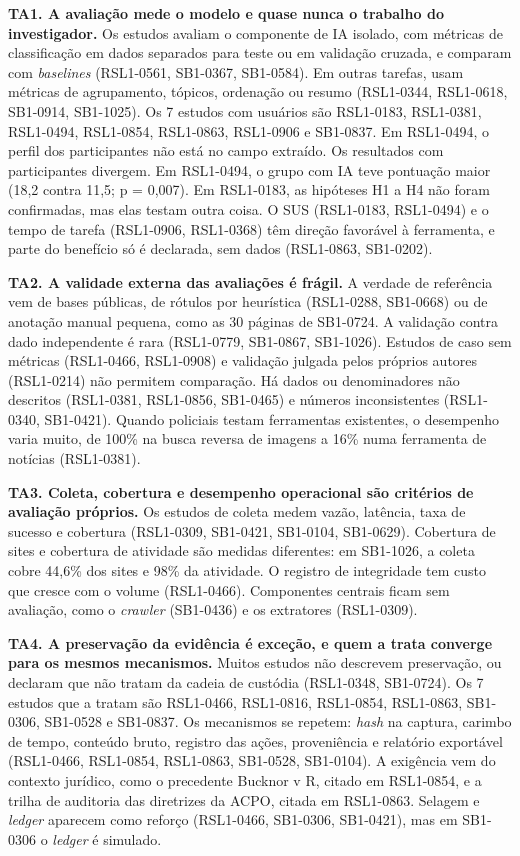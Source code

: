 \textbf{TA1. A avaliação mede o modelo e quase nunca o trabalho do
investigador.} Os estudos avaliam o componente de IA isolado, com métricas de
classificação em dados separados para teste ou em validação cruzada, e
comparam com \textit{baselines} (RSL1-0561, SB1-0367, SB1-0584). Em outras
tarefas, usam métricas de agrupamento, tópicos, ordenação ou resumo
(RSL1-0344, RSL1-0618, SB1-0914, SB1-1025). Os 7 estudos com usuários são
RSL1-0183, RSL1-0381, RSL1-0494, RSL1-0854, RSL1-0863, RSL1-0906 e SB1-0837.
Em RSL1-0494, o perfil dos participantes não está no campo extraído. Os
resultados com participantes divergem. Em RSL1-0494, o grupo com IA teve
pontuação maior (18,2 contra 11,5; p = 0,007). Em RSL1-0183, as hipóteses
H1 a H4 não foram confirmadas, mas elas testam outra coisa. O SUS
(RSL1-0183, RSL1-0494) e o tempo de tarefa (RSL1-0906, RSL1-0368) têm
direção favorável à ferramenta, e parte do benefício só é declarada, sem
dados (RSL1-0863, SB1-0202).

\textbf{TA2. A validade externa das avaliações é frágil.} A verdade de
referência vem de bases públicas, de rótulos por heurística (RSL1-0288,
SB1-0668) ou de anotação manual pequena, como as 30 páginas de SB1-0724. A
validação contra dado independente é rara (RSL1-0779, SB1-0867, SB1-1026).
Estudos de caso sem métricas (RSL1-0466, RSL1-0908) e validação julgada
pelos próprios autores (RSL1-0214) não permitem comparação. Há dados ou
denominadores não descritos (RSL1-0381, RSL1-0856, SB1-0465) e números
inconsistentes (RSL1-0340, SB1-0421). Quando policiais testam ferramentas
existentes, o desempenho varia muito, de 100\% na busca reversa de imagens a
16\% numa ferramenta de notícias (RSL1-0381).

\textbf{TA3. Coleta, cobertura e desempenho operacional são critérios de
avaliação próprios.} Os estudos de coleta medem vazão, latência, taxa de
sucesso e cobertura (RSL1-0309, SB1-0421, SB1-0104, SB1-0629). Cobertura de
sites e cobertura de atividade são medidas diferentes: em SB1-1026, a coleta
cobre 44,6\% dos sites e 98\% da atividade. O registro de integridade tem
custo que cresce com o volume (RSL1-0466). Componentes centrais ficam sem
avaliação, como o \textit{crawler} (SB1-0436) e os extratores (RSL1-0309).

\textbf{TA4. A preservação da evidência é exceção, e quem a trata converge
para os mesmos mecanismos.} Muitos estudos não descrevem preservação, ou
declaram que não tratam da cadeia de custódia (RSL1-0348, SB1-0724). Os 7
estudos que a tratam são RSL1-0466, RSL1-0816, RSL1-0854, RSL1-0863,
SB1-0306, SB1-0528 e SB1-0837. Os mecanismos se repetem: \textit{hash} na
captura, carimbo de tempo, conteúdo bruto, registro das ações, proveniência
e relatório exportável (RSL1-0466, RSL1-0854, RSL1-0863, SB1-0528,
SB1-0104). A exigência vem do contexto jurídico, como o precedente Bucknor
v R, citado em RSL1-0854, e a trilha de auditoria das diretrizes da ACPO,
citada em RSL1-0863. Selagem e \textit{ledger} aparecem como
reforço (RSL1-0466, SB1-0306, SB1-0421), mas em SB1-0306 o \textit{ledger} é
simulado.

